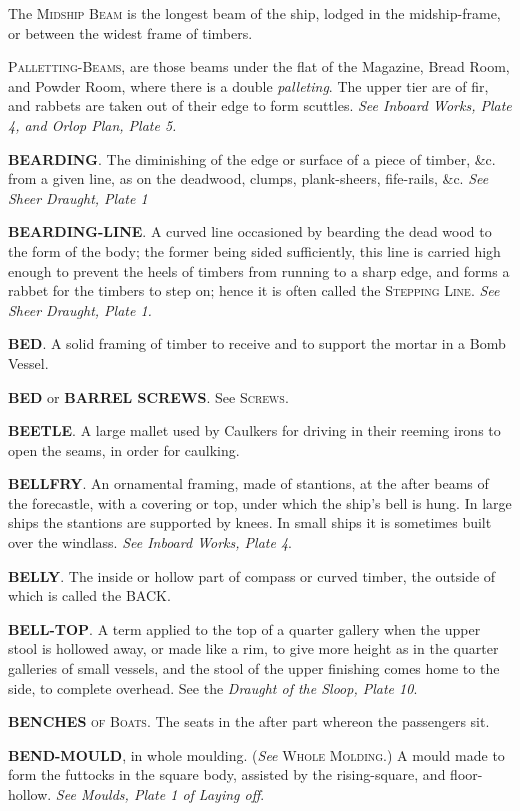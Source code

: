 The \textsc{Midship Beam} is the longest beam of the ship, lodged in the midship-frame, or between the widest frame of timbers. 

\textsc{Palletting-Beams}, are those beams under the flat of the Magazine, Bread Room, and Powder Room, where there is a double \textit{palleting}. The upper tier are of fir, and rabbets are taken out of their edge to form scuttles. \textit{See Inboard Works, Plate 4, and Orlop Plan, Plate 5.} 

\textbf{BEARDING}. The diminishing of the edge or surface of a piece of timber, \&c. from a given line, as on the deadwood, clumps, plank-sheers, fife-rails, \&c. \textit{See Sheer Draught, Plate 1}

\textbf{BEARDING-LINE}. A curved line occasioned by bearding the dead wood to the form of the body; the former being sided sufficiently, this line is carried high enough to prevent the heels of timbers from running to a sharp edge, and forms a rabbet for the timbers to step on; hence it is often called the \textsc{Stepping Line}. \textit{See Sheer Draught, Plate 1.} 

\textbf{BED}. A solid framing of timber to receive and to support the mortar in a Bomb Vessel. 

\textbf{BED} or \textbf{BARREL SCREWS}. See \textsc{Screws}. 

\textbf{BEETLE}. A large mallet used by Caulkers for driving in their reeming irons to open the seams, in order for caulking.

\textbf{BELLFRY}. An ornamental framing, made of stantions, at the after beams of the forecastle, with a covering or top, under which the ship’s bell is hung. In large ships the stantions are supported by knees. In small ships it is sometimes built over the windlass. \textit{See Inboard Works, Plate 4}. 

\textbf{BELLY}. The inside or hollow part of compass or curved timber, the outside of which is called the BACK. 

\textbf{BELL-TOP}. A term applied to the top of a quarter gallery when the upper stool is hollowed away, or made like a rim, to give more height as in the quarter galleries of small vessels, and the stool of the upper finishing comes home to the side, to complete overhead. See the \textit{Draught of the Sloop, Plate 10}. 

\textbf{BENCHES} \textsc{of Boats}. The seats in the after part whereon the passengers sit. 

\textbf{BEND-MOULD}, in whole moulding. (\textit{See} \textsc{Whole Molding}.) A mould made to form the futtocks in the square body, assisted by the rising-square, and floor-hollow. \textit{See Moulds, Plate 1 of Laying off}. 

